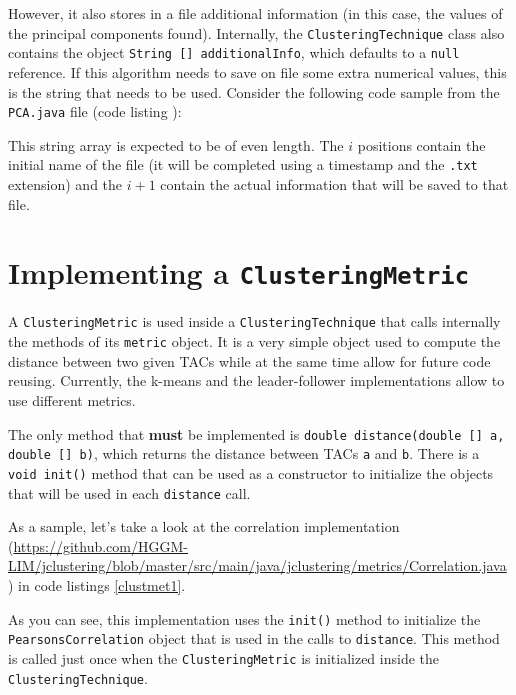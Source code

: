\documentclass[11pt]{article} %
\begin{document}
However, it also stores in a file additional information (in this case, the values of the principal components found). Internally, the {\tt ClusteringTechnique} class also contains the object {\tt String [] additionalInfo}, which defaults to a {\tt null} reference. If this algorithm needs to save on file some extra numerical values, this is the string that needs to be used. Consider the following code sample from the {\tt PCA.java} file (code listing ):



This string array is expected to be of even length. The $i$ positions contain the initial name of the file (it will be completed using a timestamp and the {\tt .txt} extension) and the $i+1$ contain the actual information that will be saved to that file.

\section{Implementing a {\tt ClusteringMetric}}
\label{sec:clustmet}

A {\tt ClusteringMetric} is used inside a {\tt ClusteringTechnique} that calls internally the methods of its {\tt metric} object. It is a very simple object used to compute the distance between two given TACs while at the same time allow for future code reusing. Currently, the k-means and the leader-follower implementations allow to use different metrics.

The only method that {\bf must} be implemented is {\tt double distance(double [] a, double [] b)}, which returns the distance between TACs {\tt a} and {\tt b}. There is a {\tt void init()} method that can be used as a constructor to initialize the objects that will be used in each {\tt distance} call.

As a sample, let's take a look at the correlation implementation (\url{https://github.com/HGGM-LIM/jclustering/blob/master/src/main/java/jclustering/metrics/Correlation.java}) in code listings \ref{clustmet1}.



As you can see, this implementation uses the {\tt init()} method to initialize the {\tt PearsonsCorrelation} object that is used in the calls to {\tt distance}. This method is called just once when the {\tt ClusteringMetric} is initialized inside the {\tt ClusteringTechnique}.
\end{document}
